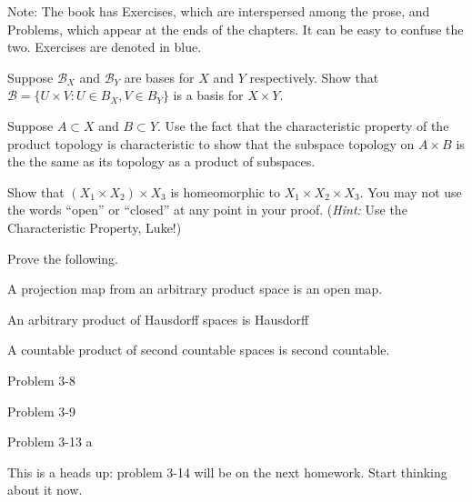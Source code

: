 \documentclass[minion]{homework651}
\begin{document}
Note: The book has Exercises, which are interspersed among the
prose, and Problems, which appear at the ends of the chapters.
It can be easy to confuse the two.  Exercises are denoted in blue.


\begin{problems}

\problem Suppose $\mathcal B_X$ and $\mathcal B_Y$ are bases for $X$ and $Y$ respectively.
Show that $\mathcal B = \{U\times V: U\in B_X, V\in B_Y\}$ is a basis for $X\times Y$.

\problem Suppose $A\subset X$ and $B\subset Y$.  Use the fact that
the characteristic property of the product topology is characteristic to
show that the subspace topology on $A\times B$ is the the same as its
topology as a product of subspaces.

\problem Show that $(X_1\times X_2)\times X_3$ is homeomorphic to $X_1\times X_2 \times X_3$.
You may not use the words ``open'' or ``closed'' at any point in your proof.  (\textit{Hint:} Use the Characteristic Property, Luke!)


\problem Prove the following.
\begin{subproblems}

\item A projection map from an arbitrary product space is an open map.

\item An arbitrary product of Hausdorff spaces is Hausdorff

\item A countable product of second countable spaces is second countable.

\end{subproblems}

\problem  Problem 3-8

\problem  Problem 3-9

\problem  Problem 3-13 a

\problem {}

\problem This is a heads up: problem 3-14 will be on the next homework.  Start thinking about it now.  
\end{problems}
\end{document}
